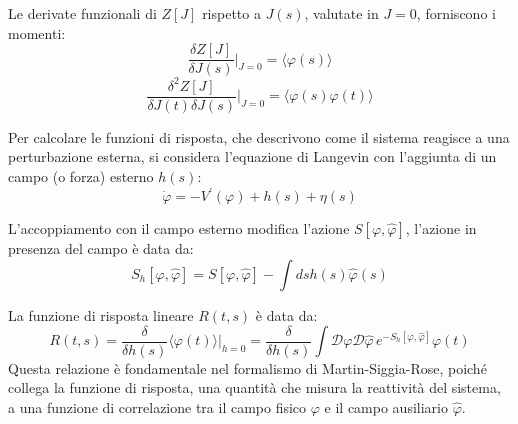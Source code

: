 Le derivate funzionali di $Z[J]$ rispetto a $J(s)$, valutate in $J=0$, forniscono i momenti:
\begin{equation}
\frac{\delta Z[J]}{\delta J(s)}\Big|_{J=0}=\langle\varphi(s)\rangle
\end{equation}
\begin{equation}
\frac{\delta^{2}Z[J]}{\delta J(t)\delta J(s)}\Big|_{J=0}=\langle\varphi(s)\varphi(t)\rangle
\end{equation}

Per calcolare le funzioni di risposta, che descrivono come il sistema reagisce a una perturbazione esterna, si considera l'equazione di Langevin con l'aggiunta di un campo (o forza) esterno $h(s)$:
\begin{equation}
\dot{\varphi}=-V^{\prime}(\varphi)+h(s)+\eta(s)
\end{equation}

L'accoppiamento con il campo esterno modifica l'azione $S[\varphi,\hat{\varphi}]$, l'azione in presenza del campo è data da:
\begin{equation}
S_{h}[\varphi,\hat{\varphi}] = S[\varphi,\hat{\varphi}] - \int ds h(s)\hat{\varphi}(s)
\end{equation}

La funzione di risposta lineare $R(t,s)$ è data da:
\begin{equation}
R(t, s) = \frac{\delta}{\delta h(s)} \langle \varphi(t) \rangle \bigg|_{h=0} = \frac{\delta}{\delta h(s)} \int \mathcal{D}\varphi \mathcal{D}\hat{\varphi} \, e^{-S_h[\varphi,\hat{\varphi}]} \varphi(t)
\end{equation}
Questa relazione è fondamentale nel formalismo di Martin-Siggia-Rose, poiché collega la funzione di risposta, una quantità che misura la reattività del sistema, a una funzione di correlazione tra il campo fisico $\varphi$ e il campo ausiliario $\hat{\varphi}$.